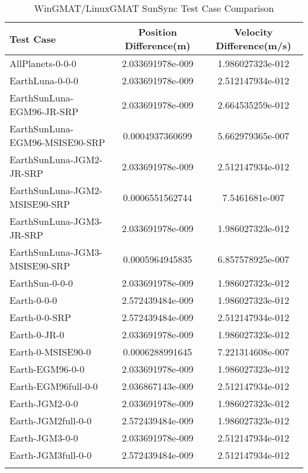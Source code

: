 \begin{table}[htbp!]
\centering
\caption{ WinGMAT/LinuxGMAT SunSync Test Case Comparison}
      \begin{tabular}{lcc}
      \hline\hline
          Test Case & Position Difference(m) & Velocity Difference(m/s) \\
         \hline
         AllPlanets-0-0-0 & 2.033691978e-009 & 1.986027323e-012 \\
         EarthLuna-0-0-0 & 2.033691978e-009 & 2.512147934e-012 \\
         EarthSunLuna-EGM96-JR-SRP & 2.033691978e-009 & 2.664535259e-012 \\
         EarthSunLuna-EGM96-MSISE90-SRP & 0.0004937360699 & 5.662979365e-007 \\
         EarthSunLuna-JGM2-JR-SRP & 2.033691978e-009 & 2.512147934e-012 \\
         EarthSunLuna-JGM2-MSISE90-SRP & 0.0006551562744 & 7.5461681e-007 \\
         EarthSunLuna-JGM3-JR-SRP & 2.033691978e-009 & 1.986027323e-012 \\
         EarthSunLuna-JGM3-MSISE90-SRP & 0.0005964945835 & 6.857578925e-007 \\
         EarthSun-0-0-0 & 2.033691978e-009 & 1.986027323e-012 \\
         Earth-0-0-0 & 2.572439484e-009 & 1.986027323e-012 \\
         Earth-0-0-SRP & 2.572439484e-009 & 2.512147934e-012 \\
         Earth-0-JR-0 & 2.033691978e-009 & 1.986027323e-012 \\
         Earth-0-MSISE90-0 & 0.0006288991645 & 7.221314608e-007 \\
         Earth-EGM96-0-0 & 2.033691978e-009 & 1.986027323e-012 \\
         Earth-EGM96full-0-0 & 2.036867143e-009 & 2.512147934e-012 \\
         Earth-JGM2-0-0 & 2.033691978e-009 & 1.986027323e-012 \\
         Earth-JGM2full-0-0 & 2.572439484e-009 & 1.986027323e-012 \\
         Earth-JGM3-0-0 & 2.033691978e-009 & 2.512147934e-012 \\
         Earth-JGM3full-0-0 & 2.572439484e-009 & 2.512147934e-012 \\
      \hline\hline
      \label{Table: SunSync WinGMAT-LinuxGMAT Table} 
\end{tabular}
\end{table}
